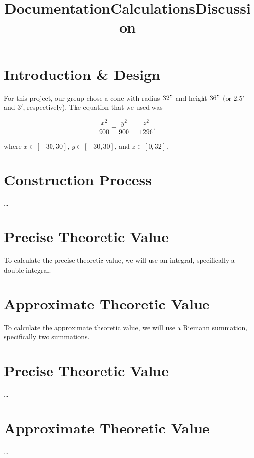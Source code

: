\documentclass[12pt]{article}
\begin{document}
\title{\textbf{Documentation}}
\author{}
\date{}
\maketitle
\vspace{-1in}

\section*{Introduction \& Design}

For this project, our group chose a cone with radius $32"$ and height
$36"$ (or $2.5'$ and $3'$, respectively). The equation that we used was 

\[
\frac{x^{2}}{900} + \frac{y^{2}}{900} = \frac{z^{2}}{1296},
\]

where $x \in [-30, 30]$, $y \in [-30, 30]$, and $z \in [0, 32]$.

\section*{Construction Process}

…

\newpage

\title{\textbf{Calculations}}
\author{}
\date{}
\maketitle
\vspace{-1in}

\section*{Precise Theoretic Value}

To calculate the precise theoretic value, we will use an integral,
specifically a double integral.

\section*{Approximate Theoretic Value}

To calculate the approximate theoretic value, we will use a Riemann 
summation, specifically two summations.

\newpage

\title{\textbf{Discussion}}
\author{}
\date{}
\maketitle
\vspace{-1in}

\section*{Precise Theoretic Value}

…

\section*{Approximate Theoretic Value}

…
\end{document}
